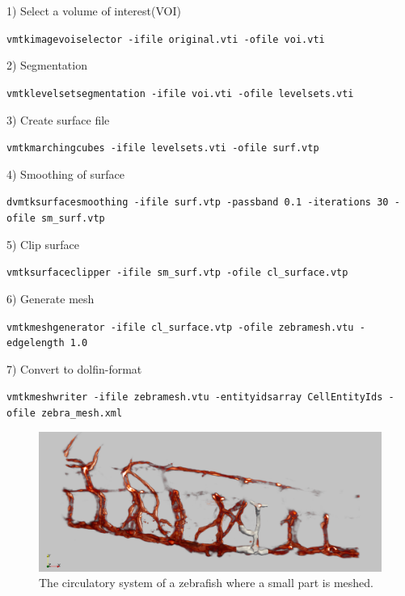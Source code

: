 \documentclass[epsfig,11pt]{article}
\begin{document}
1) Select a volume of interest(VOI)
\begin{framed}       
    \texttt{vmtkimagevoiselector -ifile original.vti -ofile voi.vti}
\end{framed}
2) Segmentation
\begin{framed}       
    \texttt{vmtklevelsetsegmentation -ifile voi.vti -ofile levelsets.vti}
\end{framed}
3) Create surface file
\begin{framed}       
    \texttt{vmtkmarchingcubes -ifile levelsets.vti -ofile surf.vtp}
\end{framed}
4) Smoothing of surface
\begin{framed}       
    \texttt{dvmtksurfacesmoothing -ifile surf.vtp -passband 0.1 -iterations 30 -ofile sm\_surf.vtp}
\end{framed}
5) Clip surface
\begin{framed}       
    \texttt{vmtksurfaceclipper -ifile sm\_surf.vtp -ofile cl\_surface.vtp}
\end{framed}
6) Generate mesh
\begin{framed}       
    \texttt{vmtkmeshgenerator -ifile cl\_surface.vtp -ofile zebramesh.vtu -edgelength
1.0}
\end{framed}
7) Convert to dolfin-format
\begin{framed}       
    \texttt{vmtkmeshwriter -ifile zebramesh.vtu -entityidsarray CellEntityIds -ofile zebra\_mesh.xml}
\end{framed}


 \begin{figure}[h!] 
\begin{center}
  \includegraphics[scale=0.3]{overview2.png}
  \end{center}
  \caption{The circulatory system of a zebrafish where a small part is meshed.}
\end{figure}
\end{document}
